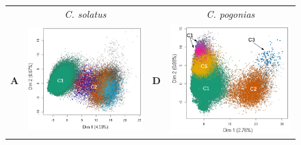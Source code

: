\documentclass[12pt,a4paper]{article}
\begin{document}
\begin{figure}	
	\begin{tabular}{cc|cc}
		  & \textit{C. solatus} &  &  \textit{C. pogonias}\\
		\textbf{A} & \includegraphics[scale=0.35]{img/solatus_ACP1.png} & \textbf{D} & \includegraphics[scale=0.35]{img/pogonias_ACP1.png} \\

\end{tabular}
\end{figure}
\end{document}
